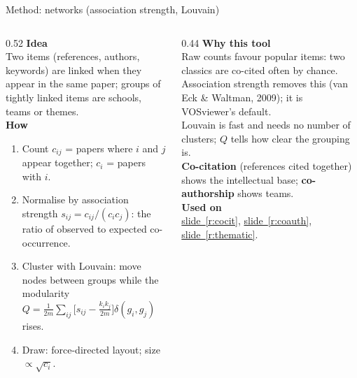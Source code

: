 \documentclass[aspectratio=169,10pt]{beamer}
\newcommand{\usedon}[1]{\hyperref[#1]{\textcolor{c4}{slide~\ref*{#1}}}}
\newcommand{\mhead}[1]{\textcolor{c1}{\textbf{#1}}\\[1pt]}
\begin{document}
\begin{frame}{Method: networks (association strength, Louvain)}
\begin{columns}[T]
\begin{column}{0.52\textwidth}\footnotesize
\mhead{Idea}
Two items (references, authors, keywords) are linked when they appear in the same paper; groups of tightly linked items are schools, teams or themes.\\[4pt]
\mhead{How}
\begin{enumerate}\setlength\itemsep{1pt}
\item Count $c_{ij}$ = papers where $i$ and $j$ appear together; $c_i$ = papers with $i$.
\item Normalise by \alert{association strength} $s_{ij} = c_{ij} / (c_i c_j)$: the ratio of observed to expected co-occurrence.
\item Cluster with \alert{Louvain}: move nodes between groups while the modularity
$Q = \frac{1}{2m}\sum_{ij}\big[s_{ij} - \frac{k_ik_j}{2m}\big]\delta(g_i,g_j)$ rises.
\item Draw: force-directed layout; size $\propto\sqrt{c_i}$.
\end{enumerate}
\end{column}
\begin{column}{0.44\textwidth}\footnotesize
\mhead{Why this tool}
Raw counts favour popular items: two classics are co-cited often by chance. Association strength removes this (van Eck \& Waltman, 2009); it is VOSviewer's default.\\[3pt]
Louvain is fast and needs no number of clusters; $Q$ tells how clear the grouping is.\\[3pt]
\textbf{Co-citation} (references cited together) shows the intellectual base; \textbf{co-authorship} shows teams.\\[6pt]
\mhead{Used on}
\usedon{r:cocit}, \usedon{r:coauth}, \usedon{r:thematic}.
\end{column}
\end{columns}
\end{frame}
\end{document}
